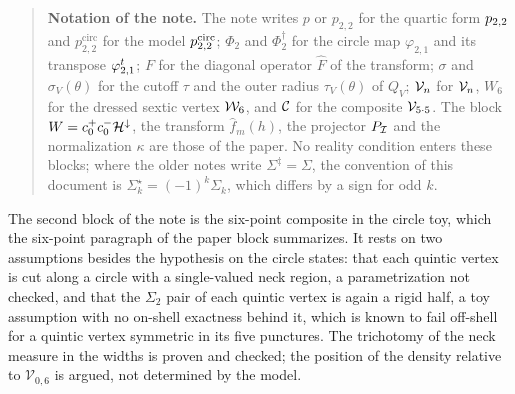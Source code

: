 \begin{quote}
  \small
  \textbf{Notation of the note.}
  The note writes $p$ or $p_{2,2}$ for the quartic form $p_{2,2}$ and $p^{\mathrm{circ}}_{2,2}$ for the model $p_{2,2}^{\mathrm{circ}}$; $\Phi_2$ and $\Phi_2^\dagger$ for the circle map $\varphi_{2,1}$ and its transpose ${\varphi_{2,1}^t}$; $F$ for the diagonal operator $\hat F$ of the transform; $\sigma$ and $\sigma_V(\theta)$ for the cutoff $\tau$ and the outer radius $\tau_V(\theta)$ of $Q_V$; ${\mathcal{V}}_n$ for $\mathcal{V}_{n}$, $W_6$ for the dressed sextic vertex $\mathcal{W}_{6}$, and ${\mathcal{C}}$ for the composite $\mathcal{V}_{5 \cdot 5}$.
  The block $W = c_0^+ c_0^- \mathcal{H}^\downarrow$, the transform $\hat f_m(h)$, the projector $P_{{\mathcal{I}}}$ and the normalization $\kappa$ are those of the paper.
  No reality condition enters these blocks; where the older notes write $\Sigma^\ddagger = \Sigma$, the convention of this document is $\Sigma_k^\star = (-1)^k \Sigma_k$, which differs by a sign for odd $k$.
\end{quote}



The second block of the note is the six-point composite in the circle toy, which the six-point paragraph of the paper block summarizes.
It rests on two assumptions besides the hypothesis on the circle states: that each quintic vertex is cut along a circle with a single-valued neck region, a parametrization not checked, and that the $\Sigma_2$ pair of each quintic vertex is again a rigid half, a toy assumption with no on-shell exactness behind it, which is known to fail off-shell for a quintic vertex symmetric in its five punctures.
The trichotomy of the neck measure in the widths is proven and checked; the position of the density relative to $\mathcal V_{0,6}$ is argued, not determined by the model.


